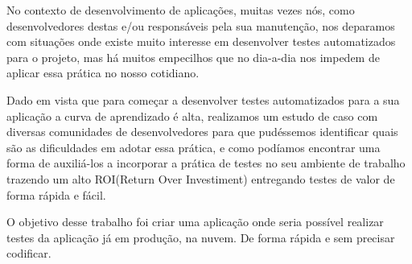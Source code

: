 No contexto de desenvolvimento de aplicações, muitas vezes nós, como desenvolvedores destas e/ou responsáveis pela sua manutenção, nos deparamos com situações onde existe muito interesse em desenvolver testes automatizados para o projeto, mas há muitos empecilhos que no dia-a-dia nos impedem de aplicar essa prática no nosso cotidiano. 

Dado em vista que para começar a desenvolver testes automatizados para a sua aplicação a curva de aprendizado é alta, realizamos um estudo de caso com diversas comunidades de desenvolvedores para que pudéssemos identificar quais são as dificuldades em adotar essa prática, e como podíamos encontrar uma forma de auxiliá-los a incorporar a prática de testes no seu ambiente de trabalho trazendo um alto ROI(Return Over Investiment) entregando testes de valor de forma rápida e fácil.

O objetivo desse trabalho foi criar uma aplicação onde seria possível realizar testes da aplicação já em produção, na nuvem. De forma rápida e sem precisar codificar.